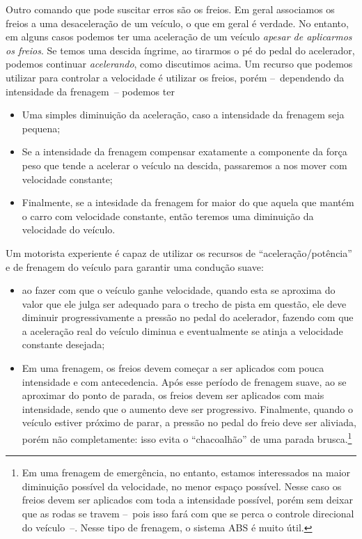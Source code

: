 Outro comando que pode suscitar erros são os freios. Em geral associamos os freios a uma desaceleração de um veículo, o que em geral é verdade. No entanto, em alguns casos podemos ter uma aceleração de um veículo \emph{apesar de aplicarmos os freios}. Se temos uma descida íngrime, ao tirarmos o pé do pedal do acelerador, podemos continuar \emph{acelerando}, como discutimos acima. Um recurso que podemos utilizar para controlar a velocidade é utilizar os freios, porém --~dependendo da intensidade da frenagem~-- podemos ter
\begin{itemize}
	\item Uma simples diminuição da aceleração, caso a intensidade da frenagem seja pequena;
	\item Se a intensidade da frenagem compensar exatamente a componente da força peso que tende a acelerar o veículo na descida, passaremos a nos mover com velocidade constante;
	\item Finalmente, se a intesidade da frenagem for maior do que aquela que mantém o carro com velocidade constante, então teremos uma diminuição da velocidade do veículo.
\end{itemize}

Um motorista experiente é capaz de utilizar os recursos de ``aceleração/potência'' e de frenagem do veículo para garantir uma condução suave:
\begin{itemize}
	\item ao fazer com que o veículo ganhe velocidade, quando esta se aproxima do valor que ele julga ser adequado para o trecho de pista em questão, ele deve diminuir progressivamente a pressão no pedal do acelerador, fazendo com que a aceleração real do veículo diminua e eventualmente se atinja a velocidade constante desejada;
	\item Em uma frenagem, os freios devem começar a ser aplicados com pouca intensidade e com antecedencia. Após esse período de frenagem suave, ao se aproximar do ponto de parada, os freios devem ser aplicados com mais intensidade, sendo que o aumento deve ser progressivo. Finalmente, quando o veículo estiver próximo de parar, a pressão no pedal do freio deve ser aliviada, porém não completamente: isso evita o ``chacoalhão'' de uma parada brusca.\footnote{Em uma frenagem de emergência, no entanto, estamos interessados na maior diminuição possível da velocidade, no menor espaço possível. Nesse caso os freios devem ser aplicados com toda a intensidade possível, porém sem deixar que as rodas se travem --~pois isso fará com que se perca o controle direcional do veículo~--. Nesse tipo de frenagem, o sistema ABS é muito útil.}
\end{itemize}


